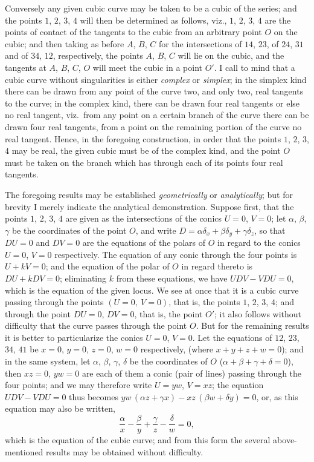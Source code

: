 \documentclass[11pt,a4paper]{article}
\begin{document}
Conversely any given cubic curve may be taken to be a cubic of the series; and
the points $1$, $2$, $3$, $4$ will then be determined as follows, viz., $1$, $2$, $3$, $4$ are the points
of contact of the tangents to the cubic from an arbitrary point $O$ on the cubic; and
then taking as before $A$, $B$, $C$ for the intersections of $14$, $23$, of $24$, $31$ and of
$34$, $12$, respectively, the points $A$, $B$, $C$ will lie on the cubic, and the tangents at
$A$, $B$, $C$, $O$ will meet the cubic in a point $O'$. I call to mind that a cubic curve
without singularities is either \textit{complex} or \textit{simplex}; in the simplex kind there can be
drawn from any point of the curve two, and only two, real tangents to the curve;
in the complex kind, there can be drawn four real tangents or else no real tangent,
viz.\ from any point on a certain branch of the curve there can be drawn four real
tangents, from a point on the remaining portion of the curve no real tangent.
Hence, in the foregoing construction, in order that the points $1$, $2$, $3$, $4$ may be real,
the given cubic must be of the complex kind, and the point $O$ must be taken on
the branch which has through each of its points four real tangents.

The foregoing results may be established \textit{geometrically} or \textit{analytically}; but for
brevity I merely indicate the analytical demonstration. Suppose first, that the points
$1$, $2$, $3$, $4$ are given as the intersections of the conics $U=0$, $V=0$; let $\alpha$, $\beta$, $\gamma$ be
the coordinates of the point $O$, and write $D=\alpha\delta_x + \beta\delta_y + \gamma\delta_z$, so that $DU=0$ and
$DV=0$ are the equations of the polars of $O$ in regard to the conics $U=0$, $V=0$
respectively. The equation of any conic through the four points is $U+kV=0$; and
the equation of the polar of $O$ in regard thereto is $DU+kDV=0$; eliminating $k$
from these equations, we have $UDV - VDU = 0$, which is the equation of the given
locus. We see at once that it is a cubic curve passing through the points
$(U=0,\ V=0)$, that is, the points $1$, $2$, $3$, $4$; and through the point $DU=0$, $DV=0$,
that is, the point $O'$; it also follows without difficulty that the curve passes through
the point $O$. But for the remaining results it is better to particularize the conics
$U=0$, $V=0$. Let the equations of $12$, $23$, $34$, $41$ be $x=0$, $y=0$, $z=0$, $w=0$
respectively, (where $x+y+z+w=0$); and in the same system, let $\alpha$, $\beta$, $\gamma$, $\delta$ be the
coordinates of $O$ ($\alpha+\beta+\gamma+\delta=0$), then $xz=0$, $yw=0$ are each of them a conic
(pair of lines) passing through the four points; and we may therefore write $U=yw$,
$V=xz$; the equation $UDV-VDU=0$ thus becomes $yw\,(\alpha z + \gamma x) - xz\,(\beta w + \delta y) = 0$, or,
as this equation may also be written,
\[
\frac{\alpha}{x} - \frac{\beta}{y} + \frac{\gamma}{z} - \frac{\delta}{w} = 0,
\]
which is the equation of the cubic curve; and from this form the several above-
mentioned results may be obtained without difficulty.
\end{document}
